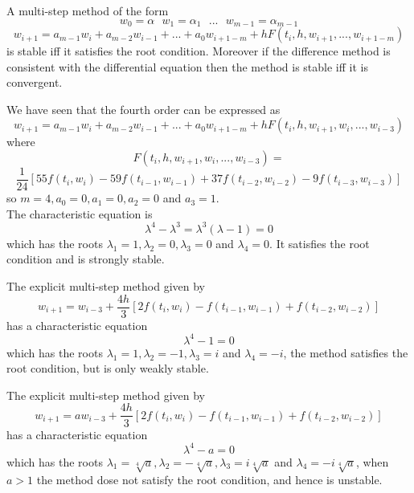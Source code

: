 \begin{theorem}
A multi-step method of the form
\[ w_0=\alpha \ \ \ w_1=\alpha_1 \ \ \ ... \ \ \ w_{m-1}=\alpha_{m-1} \]
\[w_{i+1} = a_{m-1}w_{i}+a_{m-2}w_{i-1}+...+a_{0}w_{i+1-m} +hF(t_i,h,w_{i+1},...,w_{i+1-m})\]
is stable iff it satisfies the root condition.  Moreover if the difference method
is consistent with the differential equation then the method is stable iff it is 
convergent.
\end{theorem}
\begin{example}
We have seen that the fourth order  can be expressed as
\[w_{i+1} = a_{m-1}w_{i}+a_{m-2}w_{i-1}+...+a_{0}w_{i+1-m} +hF(t_i,h,w_{i+1},w_i,...,w_{i-3})\]
where 
\[F(t_i,h,w_{i+1},w_i,...,w_{i-3})=\]
\[\frac{1}{24}[55f(t_i,w_i)-59f(t_{i-1},w_{i-1})+37f(t_{i-2},w_{i-2})-9f(t_{i-3},w_{i-3})] \]
so $m=4, a_0=0,a_1=0,a_2=0$ and $a_3=1$.\\
The characteristic equation is
\[ \lambda^4-\lambda^3=\lambda^3(\lambda-1)=0 \]
which has the roots $\lambda_1=1,\lambda_2=0,\lambda_3=0$ and $\lambda_4=0$.  It satisfies the root condition and is strongly stable.
\end{example}
\begin{example}
The explicit multi-step method given by
\[ w_{i+1}=w_{i-3}+\frac{4h}{3}[2f(t_i,w_{i})-f(t_{i-1},w_{i-1})+f(t_{i-2},w_{i-2})] \]
has a characteristic equation
\[\lambda^4-1 =0\]
which has the roots $\lambda_1=1,\lambda_2=-1,\lambda_3=i$ and $\lambda_4=-i$, the method satisfies the root condition, but is only weakly stable.
\end{example}
\begin{example}
The explicit multi-step method given by
\[ w_{i+1}=aw_{i-3}+\frac{4h}{3}[2f(t_i,w_{i})-f(t_{i-1},w_{i-1})+f(t_{i-2},w_{i-2})] \]
has a characteristic equation
\[\lambda^4-a =0\]
which has the roots $\lambda_1=\sqrt[4]{a},\lambda_2=-\sqrt[4]{a},\lambda_3=i\sqrt[4]{a}$ and $\lambda_4=-i\sqrt[4]{a}$, when $a>1$ the method dose not satisfy the root condition, and hence is unstable.
\end{example}

